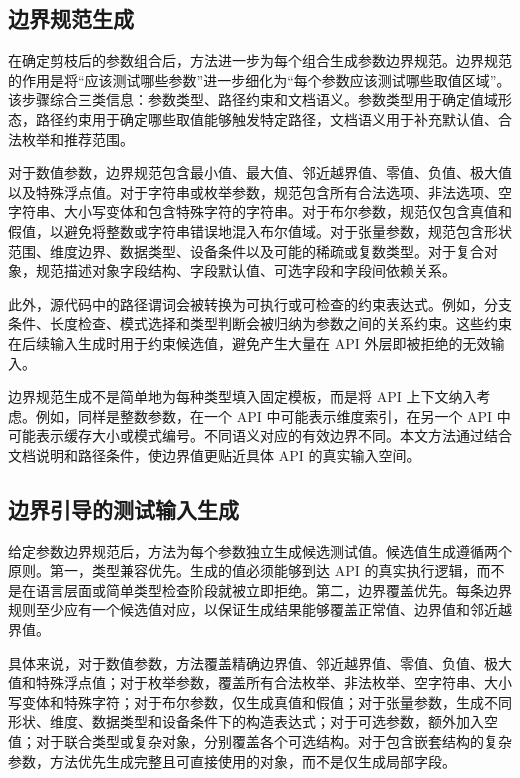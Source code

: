 \documentclass[UTF8,fontset=fandol]{ctexart}
\begin{document}
\subsection{边界规范生成}

在确定剪枝后的参数组合后，方法进一步为每个组合生成参数边界规范。边界规范的作用是将“应该测试哪些参数”进一步细化为“每个参数应该测试哪些取值区域”。该步骤综合三类信息：参数类型、路径约束和文档语义。参数类型用于确定值域形态，路径约束用于确定哪些取值能够触发特定路径，文档语义用于补充默认值、合法枚举和推荐范围。

对于数值参数，边界规范包含最小值、最大值、邻近越界值、零值、负值、极大值以及特殊浮点值。对于字符串或枚举参数，规范包含所有合法选项、非法选项、空字符串、大小写变体和包含特殊字符的字符串。对于布尔参数，规范仅包含真值和假值，以避免将整数或字符串错误地混入布尔值域。对于张量参数，规范包含形状范围、维度边界、数据类型、设备条件以及可能的稀疏或复数类型。对于复合对象，规范描述对象字段结构、字段默认值、可选字段和字段间依赖关系。

此外，源代码中的路径谓词会被转换为可执行或可检查的约束表达式。例如，分支条件、长度检查、模式选择和类型判断会被归纳为参数之间的关系约束。这些约束在后续输入生成时用于约束候选值，避免产生大量在 API 外层即被拒绝的无效输入。

边界规范生成不是简单地为每种类型填入固定模板，而是将 API 上下文纳入考虑。例如，同样是整数参数，在一个 API 中可能表示维度索引，在另一个 API 中可能表示缓存大小或模式编号。不同语义对应的有效边界不同。本文方法通过结合文档说明和路径条件，使边界值更贴近具体 API 的真实输入空间。

\subsection{边界引导的测试输入生成}

给定参数边界规范后，方法为每个参数独立生成候选测试值。候选值生成遵循两个原则。第一，类型兼容优先。生成的值必须能够到达 API 的真实执行逻辑，而不是在语言层面或简单类型检查阶段就被立即拒绝。第二，边界覆盖优先。每条边界规则至少应有一个候选值对应，以保证生成结果能够覆盖正常值、边界值和邻近越界值。

具体来说，对于数值参数，方法覆盖精确边界值、邻近越界值、零值、负值、极大值和特殊浮点值；对于枚举参数，覆盖所有合法枚举、非法枚举、空字符串、大小写变体和特殊字符；对于布尔参数，仅生成真值和假值；对于张量参数，生成不同形状、维度、数据类型和设备条件下的构造表达式；对于可选参数，额外加入空值；对于联合类型或复杂对象，分别覆盖各个可选结构。对于包含嵌套结构的复杂参数，方法优先生成完整且可直接使用的对象，而不是仅生成局部字段。
\end{document}
